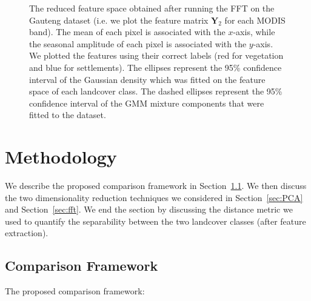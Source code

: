 \documentclass{article}
\begin{document}
\begin{figure}[h!]
%
\caption{The reduced feature space obtained after running the FFT on the Gauteng dataset (i.e. we plot the feature matrix $\mathbf{Y}_2$ for each MODIS band). The mean of each pixel is associated with the $x$-axis, while the seasonal amplitude of each pixel is associated with the $y$-axis. We plotted the features using their correct labels (red for vegetation 
and blue for settlements). The ellipses represent the 95\% confidence interval of the Gaussian density which was fitted on the feature space of each landcover class. 
The dashed ellipses represent the 95\% confidence interval of the GMM mixture components that were fitted to the dataset.}
\label{fig:density_FFT}
%
\end{figure}


\section{Methodology}
\label{sec:met}
We describe the proposed comparison framework in Section~\ref{sec:comp}. We then discuss the two dimensionality reduction techniques we considered in Section~\ref{sec:PCA} and Section~\ref{sec:fft}. 
We end the section by discussing the distance metric we used to quantify the separability between the two landcover classes (after feature extraction). 

\subsection{Comparison Framework}
\label{sec:comp}
The proposed comparison framework:
\end{document}
